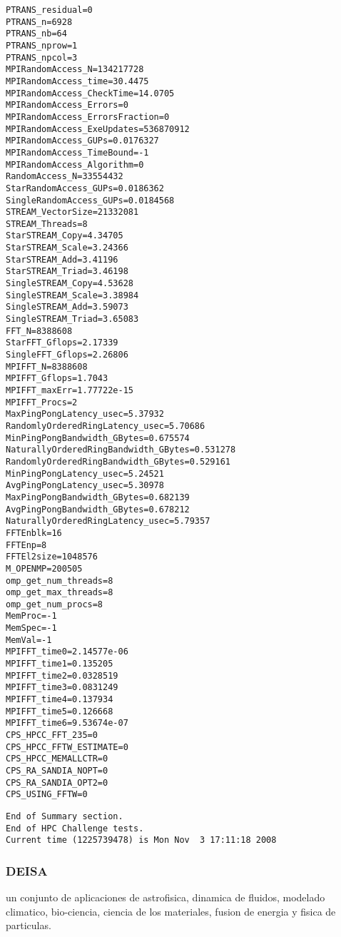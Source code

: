 \documentclass[a4paper]{report}
\begin{document}
\begin{minipage}[b]{0.5\linewidth}
\begin{verbatim}
PTRANS_residual=0
PTRANS_n=6928
PTRANS_nb=64
PTRANS_nprow=1
PTRANS_npcol=3
MPIRandomAccess_N=134217728
MPIRandomAccess_time=30.4475
MPIRandomAccess_CheckTime=14.0705
MPIRandomAccess_Errors=0
MPIRandomAccess_ErrorsFraction=0
MPIRandomAccess_ExeUpdates=536870912
MPIRandomAccess_GUPs=0.0176327
MPIRandomAccess_TimeBound=-1
MPIRandomAccess_Algorithm=0
RandomAccess_N=33554432
StarRandomAccess_GUPs=0.0186362
SingleRandomAccess_GUPs=0.0184568
STREAM_VectorSize=21332081
STREAM_Threads=8
StarSTREAM_Copy=4.34705
StarSTREAM_Scale=3.24366
StarSTREAM_Add=3.41196
StarSTREAM_Triad=3.46198
SingleSTREAM_Copy=4.53628
SingleSTREAM_Scale=3.38984
SingleSTREAM_Add=3.59073
SingleSTREAM_Triad=3.65083
FFT_N=8388608
StarFFT_Gflops=2.17339
SingleFFT_Gflops=2.26806
MPIFFT_N=8388608
MPIFFT_Gflops=1.7043
MPIFFT_maxErr=1.77722e-15
MPIFFT_Procs=2
MaxPingPongLatency_usec=5.37932
RandomlyOrderedRingLatency_usec=5.70686
MinPingPongBandwidth_GBytes=0.675574
NaturallyOrderedRingBandwidth_GBytes=0.531278
RandomlyOrderedRingBandwidth_GBytes=0.529161
MinPingPongLatency_usec=5.24521
AvgPingPongLatency_usec=5.30978
MaxPingPongBandwidth_GBytes=0.682139
AvgPingPongBandwidth_GBytes=0.678212
NaturallyOrderedRingLatency_usec=5.79357
FFTEnblk=16
FFTEnp=8
FFTEl2size=1048576
M_OPENMP=200505
omp_get_num_threads=8
omp_get_max_threads=8
omp_get_num_procs=8
MemProc=-1
MemSpec=-1
MemVal=-1
MPIFFT_time0=2.14577e-06
MPIFFT_time1=0.135205
MPIFFT_time2=0.0328519
MPIFFT_time3=0.0831249
MPIFFT_time4=0.137934
MPIFFT_time5=0.126668
MPIFFT_time6=9.53674e-07
CPS_HPCC_FFT_235=0
CPS_HPCC_FFTW_ESTIMATE=0
CPS_HPCC_MEMALLCTR=0
CPS_RA_SANDIA_NOPT=0
CPS_RA_SANDIA_OPT2=0
CPS_USING_FFTW=0
\end{verbatim}
\end{minipage}

\begin{verbatim}
End of Summary section.
End of HPC Challenge tests.
Current time (1225739478) is Mon Nov  3 17:11:18 2008
\end{verbatim}

\subsubsection{DEISA}

un conjunto de aplicaciones de astrofisica, dinamica de fluidos, modelado climatico,
bio-ciencia, ciencia de los materiales, fusion de energia y fisica de particulas.
\end{document}
